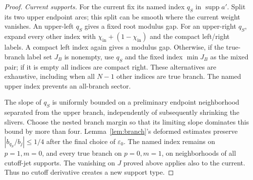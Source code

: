 \documentclass[11pt]{article}
\numberwithin{equation}{section}
\theoremstyle{definition}
\newcommand{\eps}{\varepsilon}
\begin{document}
\begin{proof}
\smallskip\noindent\textit{Current supports.}
For the current fix its named index \(q_S\) in
\(\operatorname{supp}a'\). Split its two upper endpoint arcs;
this split can be smooth where the current weight vanishes.
An upper-left \(q_S\) gives a fixed root modulus gap.
For an upper-right \(q_S\), expand every other index with
\(\chi_{\mathrm{in}}+(1-\chi_{\mathrm{in}})\) and the compact
left/right labels. A compact left index again gives a modulus
gap. Otherwise, if the true-branch label set \(J_B\) is nonempty,
use \(q_S\) and the fixed index \(\min J_B\) as the mixed pair;
if it is empty all indices are compact right. These alternatives
are exhaustive, including when all \(N-1\) other indices are
true branch. The named upper index prevents an all-branch sector.

The slope of \(q_S\) is uniformly bounded on a preliminary
endpoint neighborhood separated from the upper branch, independently
of subsequently shrinking the slivers. Choose the nested branch
margin so that its limiting slope dominates this bound by more
than four. Lemma~\ref{lem:branch}'s deformed estimates preserve
\(|b_{q_S}/b_j|\le1/4\) after the final choice of \(\eps_0\).
The named index remains on \(p=1,m=0\), and every true branch
on \(p=0,m=1\), on neighborhoods of all cutoff-jet supports.
The vanishing on \(J\) proved above applies also to the current.
Thus no cutoff derivative creates a new support type.
\end{proof}
\end{document}
